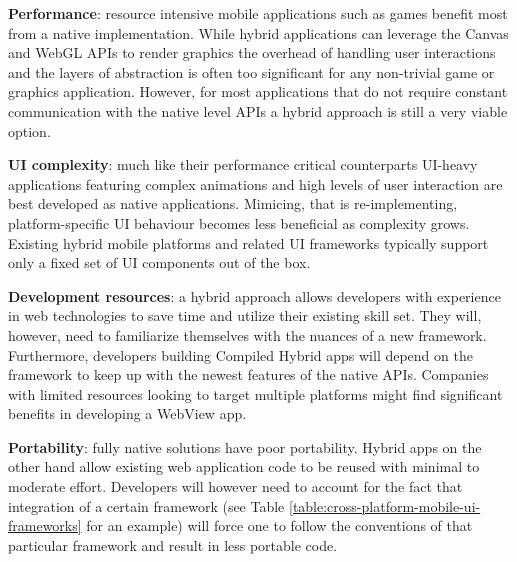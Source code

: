 \documentclass[thesis.tex]{subfiles}
\begin{document}
\begin{itemize}

	\begin{item}
	\textbf{Performance}: resource intensive mobile applications such as games benefit most from a native implementation. While hybrid applications can leverage the Canvas and WebGL APIs to render graphics the overhead of handling user interactions and the layers of abstraction is often too significant for any non-trivial game or graphics application. However, for most applications that do not require constant communication with the native level APIs a hybrid approach is still a very viable option.
	\end{item}

	\begin{item}
	\textbf{UI complexity}: much like their performance critical counterparts UI-heavy applications featuring complex animations and high levels of user interaction are best developed as native applications. Mimicing, that is re-implementing, platform-specific UI behaviour becomes less beneficial as complexity grows. Existing hybrid mobile platforms and related UI frameworks typically support only a fixed set of UI components out of the box.
	\end{item}

	\begin{item}
	\textbf{Development resources}: a hybrid approach allows developers with experience in web technologies to save time and utilize their existing skill set. They will, however, need to familiarize themselves with the nuances of a new framework. Furthermore, developers building Compiled Hybrid apps will depend on the framework to keep up with the newest features of the native APIs. Companies with limited resources looking to target multiple platforms might find significant benefits in developing a WebView app.
	\end{item}

	\begin{item}
	\textbf{Portability}: fully native solutions have poor portability. Hybrid apps on the other hand allow existing web application code to be reused with minimal to moderate effort. Developers will however need to account for the fact that integration of a certain framework (see Table \ref{table:cross-platform-mobile-ui-frameworks} for an example) will force one to follow the conventions of that particular framework and result in less portable code.
	\end{item}

\end{itemize}
\end{document}
